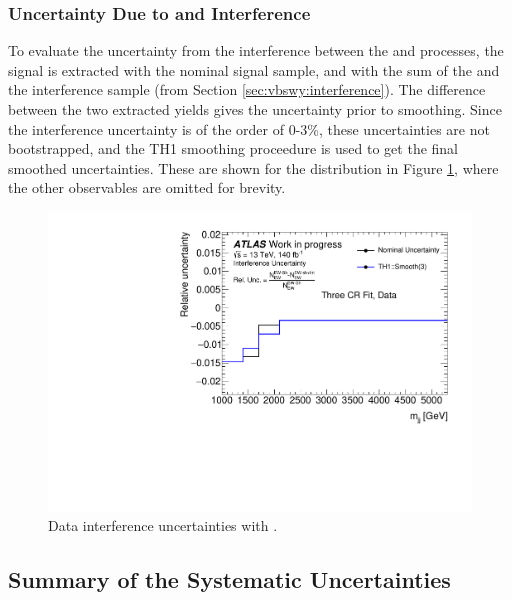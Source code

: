 \subsubsection{Uncertainty Due to \ewwy and \qcdwy Interference}

To evaluate the uncertainty from the interference between the \ewwy and \qcdwy processes, the signal is extracted with the nominal \SHERPA signal sample, and with the sum of the \SHERPA and the interference sample (from Section \ref{sec:vbswy:interference}). The difference between the two extracted yields gives the uncertainty prior to smoothing. Since the interference uncertainty is of the order of 0-3\%, these uncertainties are not bootstrapped, and the TH1 smoothing proceedure is used to get the final smoothed uncertainties. These are shown for the \mjj distribution in Figure \ref{fig:vbswy:inteferenceunc}, where the other observables are omitted for brevity.

\begin{figure}[t]
  \centering
  \includegraphics[width=\textwidth]{plots/diffx/interference/data/sys_errors_mjj_interference_3cr.pdf}
  \caption{Data interference uncertainties with \mjj.\label{fig:vbswy:inteferenceunc}}
\end{figure}

\subsection{Summary of the Systematic Uncertainties}

\label{sec:summaryofsysts}

